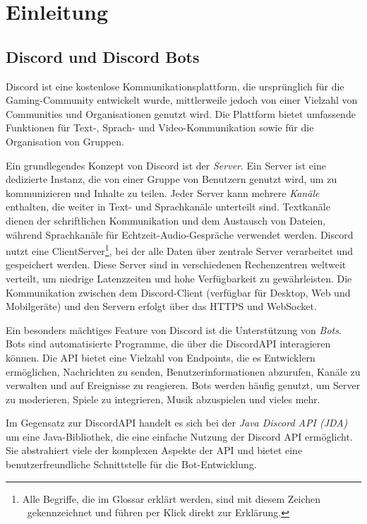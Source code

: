 
\section{Einleitung}\label{einleitung}

\subsection{Discord und Discord Bots}\label{discord-und-discord-bots}
Discord ist eine kostenlose Kommunikationsplattform, die ursprünglich für die Gaming-Com\-mu\-ni\-ty entwickelt wurde, mittlerweile jedoch von einer Vielzahl von Communities und Organisationen genutzt wird. Die Plattform bietet umfassende Funktionen für Text-, Sprach- und Video-Kommunikation sowie für die Organisation von Gruppen.

Ein grundlegendes Konzept von Discord ist der \emph{Server}. Ein Server ist eine dedizierte Instanz, die von einer Gruppe von Benutzern genutzt wird, um zu kommunizieren und Inhalte zu teilen. Jeder Server kann mehrere \emph{Kanäle} enthalten, die weiter in Text- und Sprachkanäle unterteilt sind. Textkanäle dienen der schriftlichen Kommunikation und dem Austausch von Dateien, während Sprachkanäle für Echtzeit-Audio-Gespräche verwendet werden.\autocite{discord-guide} Discord nutzt eine \gls{ClientServer}\footnote{Alle Begriffe, die im Glossar erklärt werden, sind mit diesem Zeichen \large\adfrightarrowhead\footnotesize\ gekennzeichnet und führen per Klick direkt zur Erklärung.}, bei der alle Daten über zentrale Server verarbeitet und gespeichert werden. Diese Server sind in verschiedenen Rechenzentren weltweit verteilt, um niedrige Latenzzeiten und hohe Verfügbarkeit zu gewährleisten. Die Kommunikation zwischen dem Discord-Client (verfügbar für Desktop, Web und Mobilgeräte) und den Servern erfolgt über das \gls{HTTPS} und \gls{WebSocket}.\autocite{discord-developer}

Ein besonders mächtiges Feature von Discord ist die Unterstützung von \emph{Bots}. Bots sind automatisierte Programme, die über die \gls{DiscordAPI} interagieren können. Die API bietet eine Vielzahl von \glspl{Endpoint}, die es Entwicklern ermöglichen, Nachrichten zu senden, Benutzerinformationen abzurufen, Kanäle zu verwalten und auf Ereignisse zu reagieren. Bots werden häufig genutzt, um Server zu moderieren, Spiele zu integrieren, Musik abzuspielen und vieles mehr.

Im Gegensatz zur \gls{DiscordAPI} handelt es sich bei der \emph{Java Discord API (JDA)} um eine Java-Bibliothek, die eine einfache Nutzung der Discord API ermöglicht. Sie abstrahiert viele der komplexen Aspekte der API und bietet eine benutzerfreundliche Schnittstelle für die Bot-Entwicklung.


